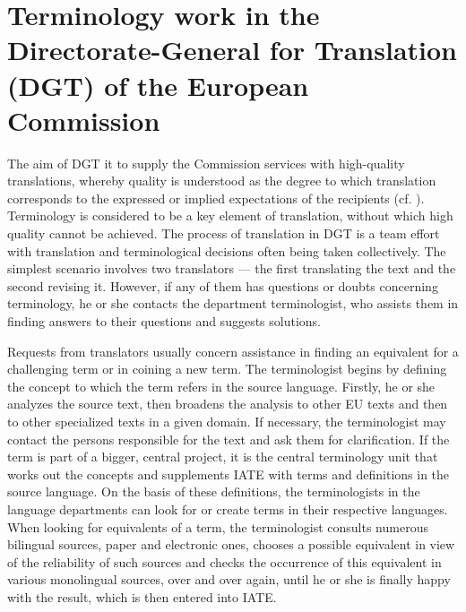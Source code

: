 \documentclass[output=paper]{langsci/langscibook}
\begin{document}
\section{Terminology work in the Directorate-General for Translation (DGT) of the European Commission}\label{sec:stefaniak:2}

The aim of DGT it to supply the Commission services with high-quality translations, whereby quality is understood as the degree to which translation corresponds to the expressed or implied expectations of the recipients (cf. \citeauthor{ISO2015b}). Terminology is considered to be a key element of translation, without which high quality cannot be achieved. The process of translation in DGT is a team effort with translation and terminological decisions often being taken collectively. The simplest scenario involves two translators — the first translating the text and the second revising it. However, if any of them has questions or doubts concerning terminology, he or she contacts the department terminologist, who assists them in finding answers to their questions and suggests solutions.

Requests from translators usually concern assistance in finding an equivalent for a challenging term or in coining a new term. The terminologist begins by defining the concept to which the term refers in the source language. Firstly, he or she analyzes the source text, then broadens the analysis to other EU texts and then to other specialized texts in a given domain. If necessary, the terminologist may contact the persons responsible for the text and ask them for clarification. If the term is part of a bigger, central project, it is the central terminology unit that works out the concepts and supplements IATE with terms and definitions in the source language. On the basis of these definitions, the terminologists in the language departments can look for or create terms in their respective languages. When looking for equivalents of a term, the terminologist consults numerous bilingual sources, paper and electronic ones, chooses a possible equivalent in view of the reliability of such sources and checks the occurrence of this equivalent in various monolingual sources, over and over again, until he or she is finally happy with the result, which is then entered into IATE.
\end{document}
